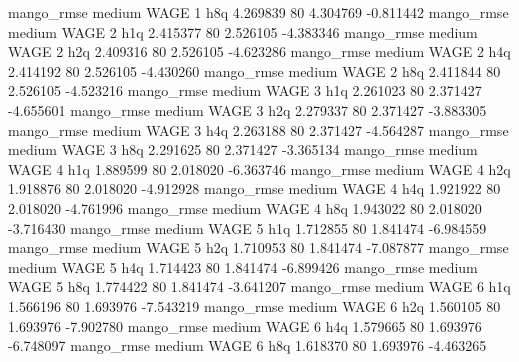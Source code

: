        mango_rmse     medium     WAGE                 1                  h8q  4.269839 80       4.304769          -0.811442
       mango_rmse     medium     WAGE                 2                  h1q  2.415377 80       2.526105          -4.383346
       mango_rmse     medium     WAGE                 2                  h2q  2.409316 80       2.526105          -4.623286
       mango_rmse     medium     WAGE                 2                  h4q  2.414192 80       2.526105          -4.430260
       mango_rmse     medium     WAGE                 2                  h8q  2.411844 80       2.526105          -4.523216
       mango_rmse     medium     WAGE                 3                  h1q  2.261023 80       2.371427          -4.655601
       mango_rmse     medium     WAGE                 3                  h2q  2.279337 80       2.371427          -3.883305
       mango_rmse     medium     WAGE                 3                  h4q  2.263188 80       2.371427          -4.564287
       mango_rmse     medium     WAGE                 3                  h8q  2.291625 80       2.371427          -3.365134
       mango_rmse     medium     WAGE                 4                  h1q  1.889599 80       2.018020          -6.363746
       mango_rmse     medium     WAGE                 4                  h2q  1.918876 80       2.018020          -4.912928
       mango_rmse     medium     WAGE                 4                  h4q  1.921922 80       2.018020          -4.761996
       mango_rmse     medium     WAGE                 4                  h8q  1.943022 80       2.018020          -3.716430
       mango_rmse     medium     WAGE                 5                  h1q  1.712855 80       1.841474          -6.984559
       mango_rmse     medium     WAGE                 5                  h2q  1.710953 80       1.841474          -7.087877
       mango_rmse     medium     WAGE                 5                  h4q  1.714423 80       1.841474          -6.899426
       mango_rmse     medium     WAGE                 5                  h8q  1.774422 80       1.841474          -3.641207
       mango_rmse     medium     WAGE                 6                  h1q  1.566196 80       1.693976          -7.543219
       mango_rmse     medium     WAGE                 6                  h2q  1.560105 80       1.693976          -7.902780
       mango_rmse     medium     WAGE                 6                  h4q  1.579665 80       1.693976          -6.748097
       mango_rmse     medium     WAGE                 6                  h8q  1.618370 80       1.693976          -4.463265
